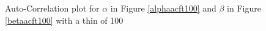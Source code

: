 \documentclass[12pt, leqno]{article}
\begin{document}
\begin{figure}
\centering
{}
\centering
\qquad
\centering
{}
\caption{Auto-Correlation plot for $\alpha$ in Figure \ref{alphaacft100} and $\beta$ in Figure \ref{betaacft100} with a thin of 100}
\end{figure}
\end{document}
